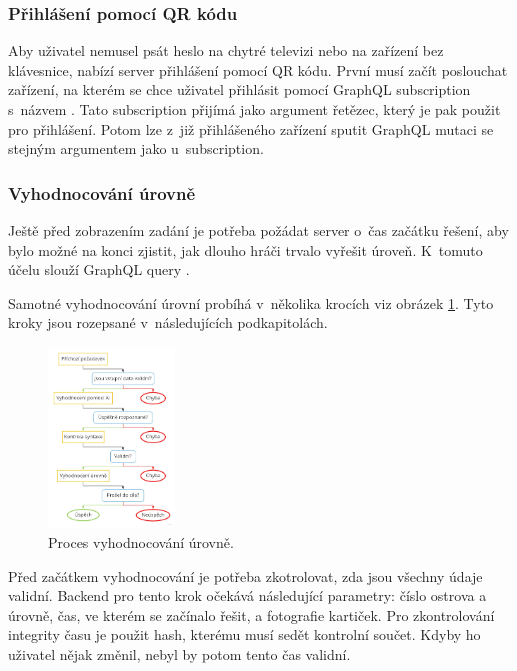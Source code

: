 \subsubsection{Přihlášení pomocí QR kódu}
Aby uživatel nemusel psát heslo na chytré televizi nebo na zařízení bez klávesnice, nabízí server přihlášení pomocí QR kódu. První musí začít poslouchat zařízení, na kterém se chce uživatel přihlásit pomocí GraphQL subscription s~názvem . Tato subscription přijímá jako argument řetězec, který je pak použit pro přihlášení. Potom lze z~již přihlášeného zařízení sputit GraphQL mutaci  se stejným argumentem jako u~subscription.

\subsubsection{Vyhodnocování úrovně}
Ještě před zobrazením zadání je potřeba požádat server o~čas začátku řešení, aby bylo možné na konci zjistit, jak dlouho hráči trvalo vyřešit úroveň. K~tomuto účelu slouží GraphQL query .\par
Samotné vyhodnocování úrovní probíhá v~několika krocích viz obrázek \ref{fig:proces-vyhodnocovani}. Tyto kroky jsou rozepsané v~následujících podkapitolách.

\begin{figure}[h]
    \centering
    \includegraphics[width=0.3\textwidth]{img/proces.jpg}
    \caption{Proces vyhodnocování úrovně.}
    \label{fig:proces-vyhodnocovani}
\end{figure}

Před začátkem vyhodnocování je potřeba zkotrolovat, zda jsou všechny údaje validní. Backend pro tento krok očekává následující parametry: číslo ostrova a úrovně, čas, ve kterém se začínalo řešit, a fotografie kartiček. Pro zkontrolování integrity času je použit hash, kterému musí sedět kontrolní součet. Kdyby ho uživatel nějak změnil, nebyl by potom tento čas validní.


